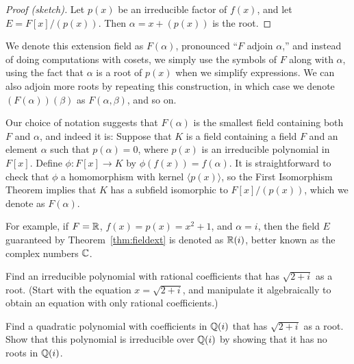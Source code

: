 \begin{proof}[Proof (sketch)]
    Let $p(x)$ be an irreducible factor of $f(x)$, and let $E=F[x]/(p(x))$. Then  $\alpha = x+(p(x))$ is the root.
\end{proof}

We denote this extension field as $F(\alpha)$, pronounced ``$F$ adjoin $\alpha$,'' and instead of doing computations with cosets, we simply use the symbols of $F$ along with $\alpha$, using the fact that $\alpha$ is a root of $p(x)$ when we simplify expressions. We can also adjoin more roots by repeating this construction, in which case we denote $(F(\alpha))(\beta)$ as $F(\alpha, \beta)$, and so on.

Our choice of notation suggests that $F(\alpha)$ is the smallest field containing both $F$ and $\alpha$, and indeed it is: Suppose that $K$ is a field containing a field $F$ and an element $\alpha$ such that $p(\alpha) = 0$, where $p(x)$ is an irreducible polynomial in $F[x]$. Define $\phi : F[x] \longrightarrow K$ by $\phi(f(x)) = f(\alpha)$. It is straightforward to check that $\phi$ a homomorphism with kernel $\langle p(x) \rangle$, so the First Isomorphism Theorem implies that $K$ has a subfield isomorphic to $F[x]/(p(x))$, which we denote as $F(\alpha)$.

For example, if $F = \mathbb{R}$, $f(x)=p(x)=x^2+1$, and $\alpha=i$, then the field $E$ guaranteed by Theorem~\ref{thm:fieldext} is denoted as $\mathbb{R}(i)$, better known as the complex numbers $\mathbb{C}$.

\begin{problem}
    Find an irreducible polynomial with rational coefficients that has $\sqrt{2+i}$ as a root. (Start with the equation $x=\sqrt{2+i}$, and manipulate it algebraically to obtain an equation with only rational coefficients.)
\end{problem}

\begin{problem}
    Find a quadratic polynomial with coefficients in $\mathbb{Q}(i)$ that has $\sqrt{2+i}$ as a root. Show that this polynomial is irreducible over $\mathbb{Q}(i)$ by showing that it has no roots in $\mathbb{Q}(i)$.
\end{problem}


